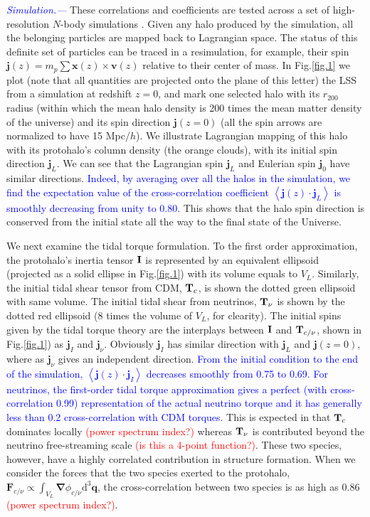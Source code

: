 \documentclass[aps,prd,twocolumn,amsmath,amssymb,amsfont,superscriptaddress]{revtex4-1}
\newcommand{\bs}{\boldsymbol}
\newcommand{\diff}{{\mathrm d}}
\newcommand{\tcb}{\textcolor{blue}}
\newcommand{\tcr}{\textcolor{red}}
\begin{document}
\tcb{\textit{Simulation.---}}
These correlations and coefficients are tested across a set of high-resolution $N$-body simulations \citep{2018ApJS..237...24Y}. Given any halo produced by the simulation, all the belonging particles are mapped back to Lagrangian space. The status of this definite set of particles can be traced in a resimulation, for example, their spin $\bs{j}(z)=m_p\sum\bs{x}(z)\times\bs{v}(z)$ relative to their center of mass. In Fig.\ref{fig.1} we plot (note that all quantities are projected onto the plane of this letter) the LSS from a simulation at redshift $z=0$, and mark one selected halo with its $r_{200}$ radius (within which the mean halo density is 200 times the mean matter density of the universe) and its spin direction $\bs{j}(z=0)$ (all the spin arrows are normalized to have 15 Mpc$/h$). 
We illustrate Lagrangian mapping of this halo with its protohalo's column density (the orange clouds), with its initial spin direction $\bs{j}_L$. We can see that the Lagrangian spin $\bs{j}_L$ and Eulerian spin $\bs{j}_0$ have similar directions. \tcb{Indeed, by averaging over all the halos in the simulation, we find the expectation value of the cross-correlation coefficient $\left\langle \bs{j}(z) \cdot \bs{j}_L \right\rangle$ is smoothly decreasing from unity to 0.80.} This shows that the halo spin direction is conserved from the initial state all the way to the final state of the Universe.

We next examine the tidal torque formulation. To the first order approximation, the protohalo's inertia tensor $\bold{I}$ is represented by an equivalent ellipsoid (projected as a solid ellipse in Fig.\ref{fig.1}) with its volume equals to $V_L$.
Similarly, the initial tidal shear tensor from CDM, $\bold{T}_c$, is shown the dotted green ellipsoid with same volume. The initial tidal shear from neutrinos, $\bold{T}_\nu$ is shown by the dotted red ellipsoid (8 times the volume of $V_L$, for clearity). The initial spins given by the tidal torque theory are the interplays between $\bold{I}$ and $\bold{T}_{c/\nu}$, shown in Fig.\ref{fig.1}) as $\bs{j}_I$ and $\bs{j}_\nu$. Obviously $\bs{j}_I$ has similar direction with $\bs{j}_L$ and $\bs{j}(z=0)$, where as $\bs{j}_\nu$ gives an independent direction. \tcb{From the initial condition to the end of the simulation, $\left\langle \bs{j}(z) \cdot \bs{j}_I \right\rangle$ decreases smoothly from 0.75 to 0.69. For neutrinos, the first-order tidal torque approximation gives a perfect (with cross-correlation 0.99) representation of the actual neutrino torque and it has generally less than 0.2 cross-correlation with CDM torques.} This is expected in that $\bold{T}_c$ dominates locally \tcr{(power spectrum index?)} whereas $\bold{T}_\nu$ is contributed beyond the neutrino free-streaming scale \tcr{(is this a 4-point function?)}. These two species, however, have a highly correlated contribution in structure formation. When we consider the forces that the two species exerted to the protohalo, $\bs{F}_{c/\nu}\propto\int_{V_L}\bs{\nabla}\phi_{c/\nu}\diff^3\bs{q}$, the cross-correlation between two species is as high as 0.86 \tcr{(power spectrum index?)}.
\end{document}
